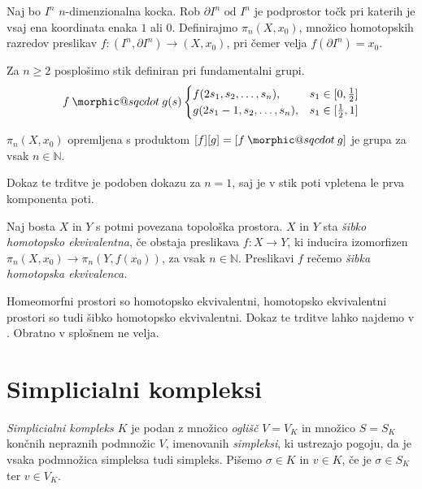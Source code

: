 \documentclass[mat1]{fmfdelo}
\makeatletter
\DeclareRobustCommand{\sqcdot}{\mathbin{\mathpalette\morphic@sqcdot\relax}}
\newcommand{\morphic@sqcdot}[2]{%
\sbox\z@{$\m@th#1\centerdot$}%
\ht\z@=.33333\ht\z@
\vcenter{\box\z@}%
}
\newcommand{\N}{\mathbb N}
\makeatother
\begin{document}
Naj bo $I^n$ $n$-dimenzionalna kocka. Rob $\partial I^n \text{ od } I^n$ je podprostor točk pri katerih je vsaj ena koordinata enaka $1$ ali $0$. Definirajmo $\pi_n(X,x_0)$, množico homotopskih razredov preslikav $f\colon (I^n,\partial I^n) \rightarrow (X,x_0)$, pri čemer velja $f(\partial I^n) = x_0$.

Za $n\ge 2$ posplošimo stik definiran pri fundamentalni grupi.
$$ f\sqcdot g(s) \begin{cases}
f(2s_1,s_2,\ldots,s_n), & s_1\in [0,\frac{1}{2}] \\
g(2s_1-1,s_2,\ldots,s_n), & s_1 \in [\frac{1}{2},1]
\end{cases}
$$


\begin{izrek}
    $\pi_n(X,x_0)$ opremljena s produktom $[f][g] = [f\sqcdot g]$ je grupa za vsak $n \in \N$.
\end{izrek}

Dokaz te trditve je podoben dokazu za $n=1$, saj je v stik poti vpletena le prva komponenta poti.

\begin{definicija}
    Naj bosta $X$ in $Y$ s potmi povezana topološka prostora.  $X$ in $Y$ sta \textit{šibko homotopsko ekvivalentna}, če obstaja preslikava $f\colon X\rightarrow Y$, ki inducira izomorfizen $\pi_n(X,x_0)\rightarrow \pi_n(Y,f(x_0))$, za vsak $n \in \N$. Preslikavi $f$ rečemo \textit{šibka homotopska ekvivalenca.}
\end{definicija}



Homeomorfni prostori so homotopsko ekvivalentni, homotopsko ekvivalentni prostori so tudi šibko homotopsko ekvivalentni. Dokaz te trditve lahko najdemo v \cite[razdelek 1.1]{hatcher}. Obratno v splošnem ne velja.


\section{Simplicialni kompleksi}\label{sec:simpleks}


\begin{definicija}
    \textit{Simplicialni kompleks $K$} je podan z množico \textit{oglišč} $V=V_K$ in množico $S=S_K$ končnih nepraznih podmnožic $V$, imenovanih \textit{simpleksi}, ki ustrezajo pogoju, da je vsaka podmnožica simpleksa tudi simpleks. Pišemo $\sigma \in K$ in $v \in K$, če je $\sigma \in S_K$ ter $v \in V_K$. 
\end{definicija}
\end{document}
